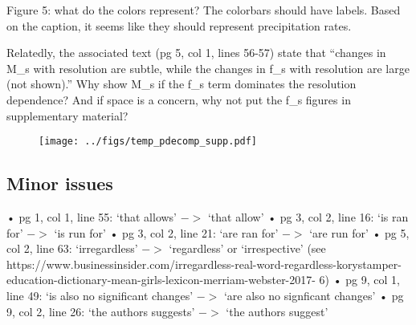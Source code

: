 \documentclass[12pt,oneside,a4paper]{article}%
\begin{document}
Figure 5: what do the colors represent? The colorbars should have labels. Based
on the caption, it seems like they should represent precipitation rates. \newline

{\color{red}{Yes, it should be precipitation rate (mm/day). We have added this title to the figure.}} \newline

Relatedly, the associated text (pg 5, col 1, lines 56-57) state that “changes in M\_s
with resolution are subtle, while the changes in f\_s with resolution are large (not
shown).” Why show M\_s if the f\_s term dominates the resolution dependence?
And if space is a concern, why not put the f\_s figures in supplementary material? \newline

{\color{red}{Part of the reason we don't show f\_s is space, yes. We also thought it was more intuitive to see that larger magnitude precipitation rates are contributing to the global mean, by subsequently unmasking larger regions of M\_s that exceed a frequency tolerance. But we understand that readers may be curious about what f\_s looks like and so we have included it as a supplementary material as the reviewer suggests. We decided to plot both log(M\_s) and log(f\_s ) and extended the x-axis so that all the data are shown.}}

\begin{figure}[t]
\begin{center}
\noindent\texttt{[image: ../figs/temp\_pdecomp\_supp.pdf]}\\
\end{center}
\caption{\small}
\label{fig:supp}
\end{figure}

\subsection*{\small Minor issues}

• pg 1, col 1, line 55: ‘that allows’ $->$ ‘that allow’ \newline
• pg 3, col 2, line 16: ‘is ran for’ $->$ ‘is run for’ \newline
• pg 3, col 2, line 21: ‘are ran for’ $->$ ‘are run for’ \newline
• pg 5, col 2, line 63: ‘irregardless’ $->$ ‘regardless’ or ‘irrespective’ (see
https://www.businessinsider.com/irregardless-real-word-regardless-korystamper-
education-dictionary-mean-girls-lexicon-merriam-webster-2017-
6) \newline
• pg 9, col 1, line 49: ‘is also no significant changes’ $->$ ‘are also no signficant
changes’ \newline
• pg 9, col 2, line 26: ‘the authors suggests’ $->$ ‘the authors suggest’ \newline
\end{document}
